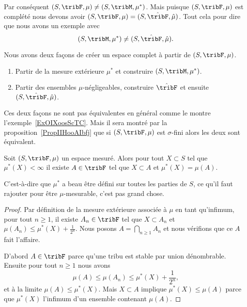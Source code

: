 \begin{example}
	Par conséquent \( (S,\tribF,\mu) \neq (S,\tribM,\mu^*)\). Mais puisque \( (S,\tribF,\mu)\) est complété nous devons avoir \( (S,\tribF,\mu)=(S,\hat\tribF,\hat\mu)\). Tout cela pour dire que nous avons un exemple avec
	\begin{equation}
		(S,\tribM,\mu^*)\neq (S,\hat\tribF,\hat \mu).
	\end{equation}
\end{example}

Nous avons deux façons de créer un espace complet à partir de \( (S,\tribF,\mu)\).
\begin{enumerate}
	\item
	      Partir de la mesure extérieure \( \mu^*\) et construire \( (S,\tribM,\mu^*)\).
	\item
	      Partir des ensembles \( \mu\)-négligeables, construire \( \hat\tribF\) et ensuite \( (S,\hat\tribF,\hat\mu)\).
\end{enumerate}
Ces deux façons ne sont pas équivalentes en général comme le montre l'exemple~\ref{ExOIXoosScTC}. Mais il sera montré par la proposition~\ref{PropIIHooAIbfj} que si \( (S,\tribF,\mu)\) est \( \sigma\)-fini alors les deux sont équivalent.

\begin{lemma}   \label{LemAESoofkMpi}
	Soit \( (S,\tribF,\mu)\) un espace mesuré. Alors pour tout \( X\subset S\) tel que \( \mu^*(X)<\infty\) il existe \( A\in\tribF\) tel que \( X\subset A\) et \( \mu^*(X)=\mu(A)\).
\end{lemma}
C'est-à-dire que \( \mu^*\) a beau être défini sur toutes les parties de \( S\), ce qu'il faut rajouter pour être \( \mu\)-mesurable, c'est pas grand chose.

\begin{proof}
	Par définition de la mesure extérieure associée à \( \mu\) en tant qu'infimum, pour tout \( n\geq 1\), il existe \( A_n\in\tribF\) tel que \( X\subset A_n\) et \( \mu(A_n)\leq \mu^*(X)+\frac{1}{ 2^n }\). Nous posons \( A=\bigcap_{n\geq 1}A_n\) et nous vérifions que ce \( A\) fait l'affaire.

	D'abord \( A\in\tribF\) parce qu'une tribu est stable par union dénombrable. Ensuite pour tout \( n\geq 1\) nous avons
	\begin{equation}
		\mu(A)\leq \mu(A_n)\leq \mu^*(X)+\frac{1}{ 2^n },
	\end{equation}
	et à la limite \( \mu(A)\leq \mu^*(X)\). Mais \( X\subset A\) implique \( \mu^*(X)\leq \mu(A)\) parce que \( \mu^*(X)\) l'infimum d'un ensemble contenant \( \mu(A)\).
\end{proof}

